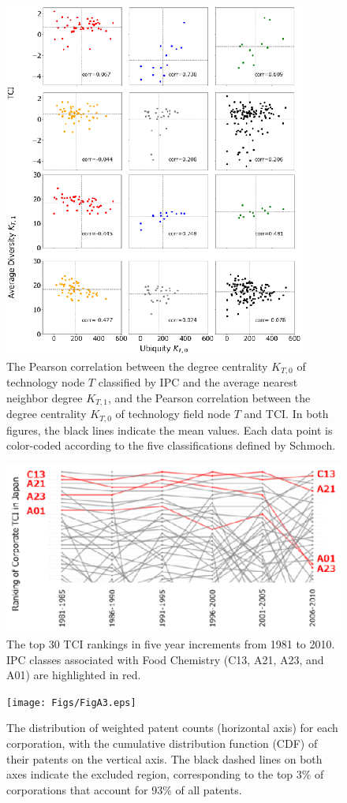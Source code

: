 \documentclass[fleqn,10pt]{wlscirep}
\begin{document}
\begin{figure}[ht]
    \centering
    \includegraphics[scale=3.50]{Figs/FigA1.eps}
    \caption{The Pearson correlation between the degree centrality \( K_{T,0} \) of technology node \( T \) classified by IPC and the average nearest neighbor degree \( K_{T,1} \), and the Pearson correlation between the degree centrality \( K_{T,0} \) of technology field node \( T \) and TCI. In both figures, the black lines indicate the mean values. Each data point is color-coded according to the five classifications defined by Schmoch\cite{Schmoch2008}.}
    \label{fig:persector}
\end{figure}

\begin{figure}[ht]
    \centering
    \includegraphics[scale=2.50]{Figs/FigA2.eps}
    \caption{The top 30 TCI rankings in five year increments from 1981 to 2010. IPC classes associated with Food Chemistry (C13, A21, A23, and A01) are highlighted in red.}
    \label{fig:bump}
\end{figure}

\begin{figure}[ht]
    \centering
    \texttt{[image: Figs/FigA3.eps]}
    \caption{The distribution of weighted patent counts (horizontal axis) for each corporation, with the cumulative distribution function (CDF) of their patents on the vertical axis. The black dashed lines on both axes indicate the excluded region, corresponding to the top 3\% of corporations that account for 93\% of all patents.}
    \label{fig:patentdistribution}
\end{figure}
\end{document}
